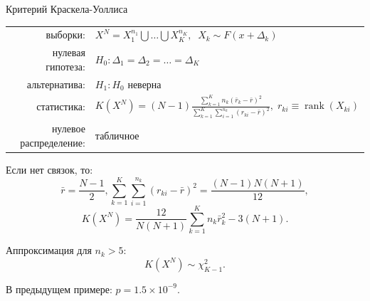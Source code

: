 \documentclass[9pt,pdf,utf8,hyperref={unicode},aspectratio=169]{beamer}
\DeclareMathOperator{\rank}{rank}
\begin{document}
\begin{frame}{Критерий Краскела-Уоллиса}
    \vspace{-10pt}
    
    \begin{center}
        \begin{tabular}{rl}
            выборки:                        & $X^N = X_1^{n_1}\bigcup\ldots\bigcup X_K^{n_K}, \;\; X_{k} \sim F\left(x + \Delta_k\right)$ \\
            нулевая гипотеза:               & $H_0\colon \Delta_1 = \Delta_2 = \ldots = \Delta_K$ \\
            альтернатива:                   & $H_1\colon H_0$ неверна\\
            статистика:                     & $K\left(X^N\right) = \left(N-1\right)\frac{\sum\limits_{k=1}^K n_k \left(\bar{r}_k-\bar{r}\right)^2 }{\sum\limits_{k=1}^K \sum\limits_{i=1}^{n_k} \left(r_{ki} - \bar{r}\right)^2}, \; r_{ki} \equiv \rank \left(X_{ki}\right)$\\
            нулевое распределение:          & табличное\\
        \end{tabular}
    \end{center}
    Если нет связок, то:
    $$\bar{r} = \frac{N-1}{2}, \sum\limits_{k=1}^K \sum\limits_{i=1}^{n_k} \left(r_{ki} - \bar{r}\right)^2 = \frac{\left(N-1\right) N \left( N+1\right) }{12}, $$
     $$   K\left(X^N\right) = \frac{12}{N\left(N+1\right)} \sum\limits_{k=1}^K n_k \bar{r}_k^2 - 3\left(N+1\right). $$

    Аппроксимация для $n_k>5$:
    $$K\left(X^N\right) \sim \chi^2_{K-1}.$$
	
	\bigskip	

    В предыдущем примере: $p=1.5\times 10^{-9}.$
\end{frame}
\end{document}
